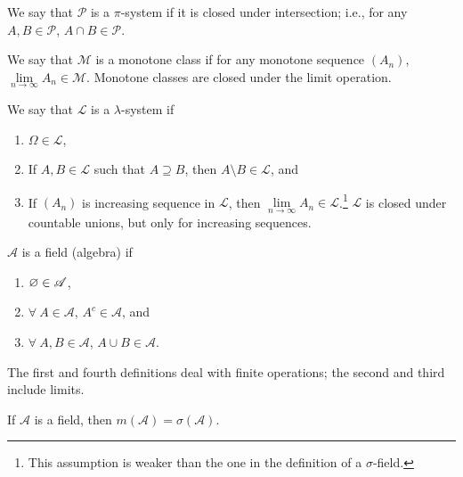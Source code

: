 \begin{definition}
	We say that $\mathscr{P}$ is a $\pi$-system if it is closed under intersection; i.e., for any $A,B \in \mathscr{P}$, $A \cap B \in \mathscr{P}$.

	We say that $\mathscr{M}$ is a monotone class if for any monotone sequence $(A_n)$, $\lim\limits_{n \to \infty} A_n \in \mathscr{M}$. Monotone classes are closed under the limit operation.

	We say that $\mathscr{L}$ is a $\lambda$-system if 
	\begin{enumerate}[label=(\roman*)]
		\item $\Omega \in \mathscr{L} $,
		\item If $A, B \in \mathscr{L}$ such that $A \supseteq B$, then $A \setminus B \in \mathscr{L}$, and 
		\item If $(A_n)$ is increasing sequence in $\mathscr{L}$, then $\lim\limits_{n \to \infty} A_n \in \mathscr{L}$.\footnote{This assumption is weaker than the one in the definition of a $\sigma$-field.} $\mathscr{L}$ is closed under countable unions, but only for increasing sequences.
	\end{enumerate}

	$\mathscr{A}$ is a field (algebra) if 
	\begin{enumerate}[label=(\roman*)]
		\item $\varnothing \in \mathscr{A}$,
		\item $\forall\  A \in \mathscr{A}$, $A^{c}\in \mathscr{A}$, and 
		\item $\forall\  A, B \in \mathscr{A}$, $A \cup B \in \mathscr{A}$.
	\end{enumerate}
\end{definition}

The first and fourth definitions deal with finite operations; the second and third include limits.

\begin{theorem}
	 If $\mathscr{A}$ is a field, then $m(\mathscr{A}) = \sigma(\mathscr{A})$.
\end{theorem}


